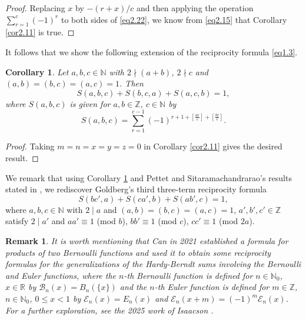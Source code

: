 \documentclass[reqno]{amsart}
\numberwithin{equation}{section}
\newtheorem{remark}[thm]{Remark}
\newtheorem{corollary}[thm]{Corollary}
\begin{document}
\begin{proof} Replacing $x$ by $-(r+x)/c$ and then applying the operation $\sum_{r=1}^{c}(-1)^{r}$ to both sides of \eqref{eq2.22}, we know from \eqref{eq2.15} that Corollary \ref{cor2.11} is true.
\end{proof}

It follows that we show the following extension of the reciprocity formula \eqref{eq1.3}.

\begin{corollary}\label{cor2.12} Let $a,b,c\in\mathbb{N}$ with $2\nmid (a+b)$, $2\nmid c$ and $(a,b)=(b,c)=(a,c)=1$. Then
\begin{equation}\label{eq2.24}
S(a,b,c)+S(b,c,a)+S(a,c,b)=1,
\end{equation}
where $S(a,b,c)$ is given for $a,b\in\mathbb{Z}$, $c\in\mathbb{N}$ by
\begin{equation*}
S(a,b,c)=\sum_{r=1}^{c-1}(-1)^{r+1+[\frac{ar}{c}]+[\frac{br}{c}]}.
\end{equation*}
\end{corollary}

\begin{proof}
Taking $m=n=x=y=z=0$ in Corollary \ref{cor2.11} gives the desired result.
\end{proof}

We remark that using Corollary \ref{cor2.12} and Pettet and Sitaramachandrarao's results stated in \cite[Equations (3.2), (3.3) and (3.4)]{pettet}, we rediscover Goldberg's \cite[Theorem 5.2]{goldberg} third three-term reciprocity formula
\begin{equation}\label{eq2.25}
S(bc',a)+S(ca',b)+S(ab',c)=1,
\end{equation}
where $a,b,c\in\mathbb{N}$ with $2\mid a$ and $(a,b)=(b,c)=(a,c)=1$, $a',b',c'\in\mathbb{Z}$ satisfy $2\mid a'$ and $aa'\equiv 1$ (mod $b$), $bb'\equiv 1$ (mod $c$), $cc'\equiv 1$ (mod $2a$).

\begin{remark}\label{rem2.13}
It is worth mentioning that Can \cite[Theorem 3]{can} in 2021 established a formula for products of two Bernoulli functions and used it to obtain some reciprocity formulas for the generalizations of the Hardy-Berndt sums involving the Bernoulli and Euler functions, where the $n$-th Bernoulli function is defined for $n\in\mathbb{N}_{0}$, $x\in\mathbb{R}$ by $\mathcal{B}_{n}(x)=B_{n}(\{x\})$ and the $n$-th Euler function is defined for $m\in\mathbb{Z}$, $n\in\mathbb{N}_{0}$, $0\leq x<1$ by $\mathcal{E}_{n}(x)=E_{n}(x)$ and $\mathcal{E}_{n}(x+m)=(-1)^{m}\mathcal{E}_{n}(x)$. For a further exploration, see the 2025 work of Isaacson \cite{isaacson}.

\end{remark}
\end{document}
